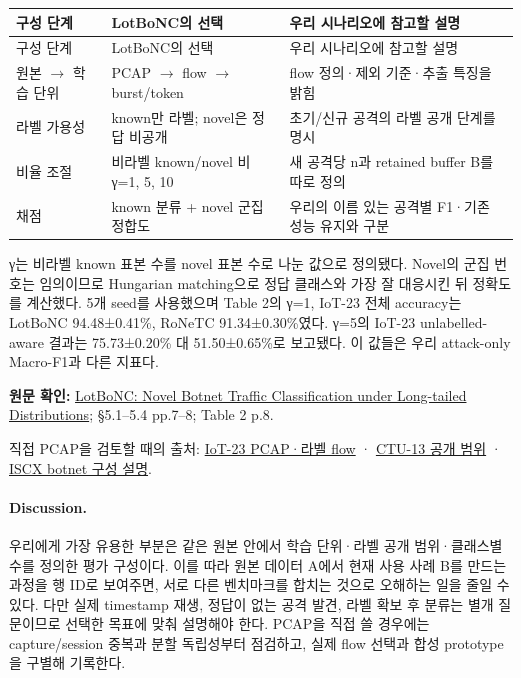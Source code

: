 \begingroup
\footnotesize
\begin{longtable}{>{\raggedright\arraybackslash}p{}>{\raggedright\arraybackslash}p{}>{\raggedright\arraybackslash}p{}}
\toprule
구성 단계 & LotBoNC의 선택 & 우리 시나리오에 참고할 설명 \\ \midrule
\endfirsthead
구성 단계 & LotBoNC의 선택 & 우리 시나리오에 참고할 설명 \\ \midrule
\endhead
{}원본 \ensuremath{\rightarrow} 학습 단위 & PCAP \ensuremath{\rightarrow} flow \ensuremath{\rightarrow} burst/\allowbreak{}token & flow 정의·제외 기준·추출 특징을 밝힘 \\
{}라벨 가용성 & known만 라벨; novel은 정답 비공개 & 초기/\allowbreak{}신규 공격의 라벨 공개 단계를 명시 \\
{}비율 조절 & 비라벨 known/\allowbreak{}novel 비 γ=\allowbreak{}1, 5, 10 & 새 공격당 n과 retained buffer B를 따로 정의 \\
{}채점 & known 분류 +\allowbreak{} novel 군집 정합도 & 우리의 이름 있는 공격별 F1·기존 성능 유지와 구분 \\
\bottomrule
\end{longtable}
\endgroup


γ는 비라벨 known 표본 수를 novel 표본 수로 나눈 값으로 정의됐다. Novel의 군집 번호는 임의이므로 Hungarian matching으로 정답 클래스와 가장 잘 대응시킨 뒤 정확도를 계산했다. 5개 seed를 사용했으며 Table 2의 γ=\allowbreak{}1, IoT-23 전체 accuracy는 LotBoNC 94.48±0.41\%, RoNeTC 91.34±0.30\%였다. γ=\allowbreak{}5의 IoT-23 unlabelled-aware 결과는 75.73±0.20\% 대 51.50±0.65\%로 보고됐다. 이 값들은 우리 attack-only Macro-F1과 다른 지표다.


{\small\textbf{원문 확인:} \href{https://doi.org/10.1145/3779208.3785276}{LotBoNC: Novel Botnet Traffic Classification under Long-tailed Distributions}; §5.1–5.4 pp.7–8; Table 2 p.8.}\par

직접 PCAP을 검토할 때의 출처: \href{https://www.stratosphereips.org/datasets-iot23}{IoT-23 PCAP·라벨 flow} · \href{https://www.stratosphereips.org/datasets-ctu13}{CTU-13 공개 범위} · \href{https://www.unb.ca/cic/datasets/botnet.html}{ISCX botnet 구성 설명}.


\paragraph{Discussion.} 우리에게 가장 유용한 부분은 같은 원본 안에서 학습 단위·라벨 공개 범위·클래스별 수를 정의한 평가 구성이다. 이를 따라 원본 데이터 A에서 현재 사용 사례 B를 만드는 과정을 행 ID로 보여주면, 서로 다른 벤치마크를 합치는 것으로 오해하는 일을 줄일 수 있다. 다만 실제 timestamp 재생, 정답이 없는 공격 발견, 라벨 확보 후 분류는 별개 질문이므로 선택한 목표에 맞춰 설명해야 한다. PCAP을 직접 쓸 경우에는 capture/\allowbreak{}session 중복과 분할 독립성부터 점검하고, 실제 flow 선택과 합성 prototype을 구별해 기록한다.


